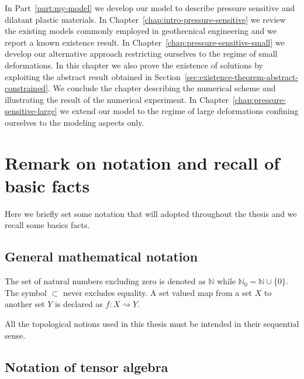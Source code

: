 \documentclass[a4paper,10pt,oneside]{amsbook}
\numberwithin{section}{chapter}
\numberwithin{equation}{chapter}
\theoremstyle{definition}
\begin{document}
In Part~\ref{part:my-model} we develop our model to describe pressure sensitive and dilatant plastic materials. In Chapter~\ref{chap:intro-pressure-sensitive} we review the existing models commonly employed in geothecnical engineering and we report a known existence result. In Chapter~\ref{chap:pressure-sensitive-small} we develop our alternative approach restricting ourselves to the regime of small deformations. In this chapter we also prove the existence of solutions by exploiting the abstract result obtained in Section~\ref{sec:existence-theorem-abstract-constrained}. We conclude the chapter describing the numerical scheme and illustrating the result of the numerical experiment. In Chapter~\ref{chap:pressure-sensitive-large} we extend our model to the regime of large deformations confining ourselves to the modeling aspects only.

\section*{Remark on notation and recall of basic facts}

Here we briefly set some notation that will adopted throughout the thesis and we recall some basics facts.

\subsection*{General mathematical notation}

The set of natural numbers excluding zero is denoted as $\mathbb{N}$ while $\mathbb{N}_0=\mathbb{N}\cup\{0\}$. The symbol $\subset$ never excludes equality. A set valued map from a set $X$ to another set $Y$ is declared as $f\colon X\rightsquigarrow Y$.

All the topological notions used in this thesis must be intended in their sequential sense.

\subsection*{Notation of tensor algebra}
\end{document}
